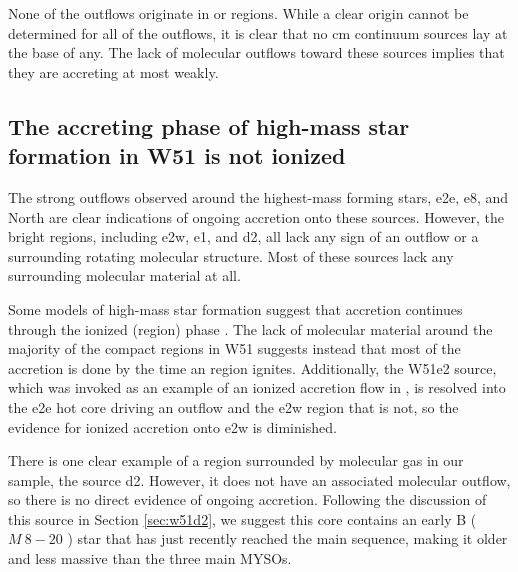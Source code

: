 \documentclass{emulateapj}
\begin{document}
None of the outflows originate in \uchii or \hchii regions.  While a clear
origin cannot be determined for all of the outflows, it is clear that no cm
continuum sources lay at the base of any.  The lack of molecular outflows
toward these sources implies that they are accreting at most weakly.
% 

\subsection{The accreting phase of high-mass star formation in W51 is not ionized}
\label{sec:accretionandoutflows}
The strong outflows observed around the highest-mass forming stars, e2e, e8,
and North are clear indications of ongoing accretion onto these sources.
However, the bright \hii regions, including e2w, e1, and d2, all lack any sign
of an outflow or a surrounding rotating molecular structure.  Most of these
sources lack any surrounding molecular material at all.

Some models of high-mass star formation suggest that accretion continues
through the ionized (\hii region) phase \citep{Keto2002b,Keto2003a}.  The lack
of molecular material around the majority of the compact \hii regions in W51
suggests instead that most of the accretion is done by the time an \hii region
ignites.  Additionally, the W51e2 source, which was invoked as an example of an
ionized accretion flow in \citet{Keto2008a}, is  resolved into the e2e
hot core driving an outflow and the e2w \hchii region that is not, so the
evidence for ionized accretion onto e2w is diminished.

There is one clear example of a \hchii region surrounded by molecular gas in
our sample, the source d2.  However, it does not have an associated molecular
outflow, so there is no direct evidence of ongoing accretion.
Following the discussion of this source in Section \ref{sec:w51d2}, we suggest
this core contains an early B ($M~8-20$ \msun) star that has just recently
reached the main sequence, making it older and less massive than the three main
MYSOs.

% 
\end{document}
